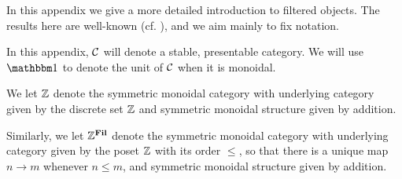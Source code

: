 

In this appendix we give a more detailed introduction to filtered objects.
The results here are well-known (cf. \cite{RotationInvariance}), and we aim mainly to fix notation.

\begin{cnv}
  In this appendix, $\mathcal{C}$ will denote a stable, presentable category.
  We will use $\o$ to denote the unit of $\mathcal{C}$ when it is monoidal.
\end{cnv}


\begin{dfn}
  We let $\mathbb{Z}$ denote the symmetric monoidal category with underlying category given by the discrete set $\mathbb{Z}$ and symmetric monoidal structure given by addition.

  Similarly, we let $\mathbb{Z}^{\operatorname{\mathbf{Fil}}}$ denote the symmetric monoidal category with underlying category given by the poset $\mathbb{Z}$ with its order $\leq$, so that there is a unique map $n \to m$ whenever $n \leq m$, and symmetric monoidal structure given by addition.
\end{dfn}

